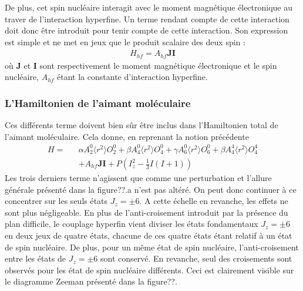 De plus, cet spin nucléaire interagit avec le moment magnétique électronique au traver de l'interaction hyperfine. Un terme rendant compte de cette interaction doit donc \^etre introduit pour tenir compte de cette interaction. Son expression est simple et ne met en jeux que le produit scalaire des deux spin :
\begin{eqnarray}
H_{hf} = A_{hf}\mathbf{J}\mathbf{I}
\end{eqnarray}
où $\mathbf{J}$ et $\mathbf{I}$ sont respectivement le moment magnétique électronique et le spin nucléaire, $A_{hf}$ étant la constante d'interaction hyperfine.

\subsubsection{L'Hamiltonien de l'aimant moléculaire}

Ces différents terme doivent bien s\^ur \^etre inclus dans l'Hamiltonien total de l'aimant moléculaire. Cela donne, en reprenant la notion précédente
\begin{eqnarray}
H =&& \alpha A_2^0 \langle r^2 \rangle O_2^0 + \beta A_4^0 \langle r^2 \rangle O_4^0 + \gamma A_6^0 \langle r^2 \rangle O_6^0 + \beta A_4^4 \langle r^2 \rangle O_4^4 \\ \nonumber
 &&+ A_{hf}\mathbf{J}\mathbf{I} + P\left(I_z^2 - \frac{1}{3}I(I+1)\right)
\end{eqnarray}
Les trois derniers terme n'agissent que comme une perturbation et l'allure générale présenté dans la figure??.a n'est pas altéré. On peut donc continuer à ce concentrer sur les seuls états $J_z = \pm 6$. A cette échelle en revanche, les effets ne sont plus négligeable. En plus de l'anti-croisement introduit par la présence du plan difficile, le couplage hyperfin vient diviser les états fondamentaux  $J_z = \pm 6$ en deux jeux de quatre états, chacune de ces quatre états étant relatif à un état de spin nucléaire. De plus, pour un m\^eme état de spin nucléaire, l'anti-croisement entre les états de  $J_z = \pm 6$ sont conservé. En revanche, seul des croisements sont observés pour les état de spin nucléaire différents. Ceci est clairement visible sur le diagramme Zeeman présenté dans la figure??.
